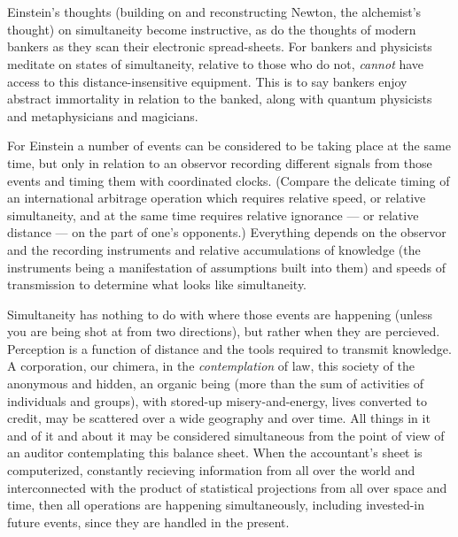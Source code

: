 \chapter{}

Einstein's thoughts (building on and reconstructing Newton, the alchemist's thought) on simultaneity become instructive, as do the thoughts of modern bankers as they scan their electronic spread-sheets. For bankers and physicists meditate on states of simultaneity, relative to those who do not, \emph{cannot} have access to this distance-insensitive equipment. This is to say bankers enjoy abstract immortality in relation to the banked, along with quantum physicists and metaphysicians and magicians.

For Einstein a number of events can be considered to be taking place at the same time, but only in relation to an observor recording different signals from those events and timing them with coordinated clocks. (Compare the delicate timing of an international arbitrage operation which requires relative speed, or relative simultaneity, and at the same time requires relative ignorance --- or relative distance --- on the part of one's opponents.) Everything depends on the observor and the recording instruments and relative accumulations of knowledge (the instruments being a manifestation of assumptions built into them) and speeds of transmission to determine what looks like simultaneity.

Simultaneity has nothing to do with where those events are happening (unless you are being shot at from two directions), but rather when they are percieved. Perception is a function of distance and the tools required to transmit knowledge. A corporation, our chimera, in the \emph{contemplation} of law, this society of the anonymous and hidden, an organic being (more than the sum of activities of individuals and groups), with stored-up misery-and-energy, lives converted to credit, may be scattered over a wide geography and over time. All things in it and of it and about it may be considered simultaneous from the point of view of an auditor contemplating this balance sheet. When the accountant's sheet is computerized, constantly recieving information from all over the world and interconnected with the product of statistical projections from all over space and time, then all operations are happening simultaneously, including invested-in future events, since they are handled in the present.

